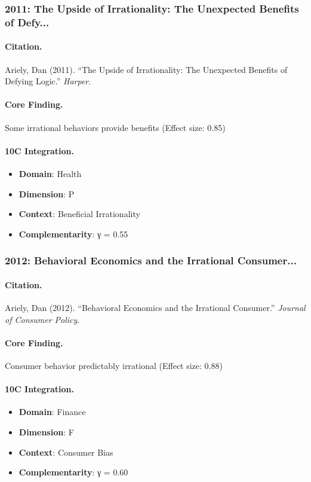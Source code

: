 \subsubsection{2011: The Upside of Irrationality: The Unexpected Benefits of Defy...}

\paragraph{Citation.}
Ariely, Dan (2011). ``The Upside of Irrationality: The Unexpected Benefits of Defying Logic.''
\textit{Harper}.

\paragraph{Core Finding.}
Some irrational behaviors provide benefits (Effect size: 0.85)

\paragraph{10C Integration.}
\begin{itemize}[nosep]
  \item \textbf{Domain}: Health
  \item \textbf{Dimension}: P
  \item \textbf{Context}: Beneficial Irrationality
  \item \textbf{Complementarity}: γ = 0.55
\end{itemize}

\subsubsection{2012: Behavioral Economics and the Irrational Consumer...}

\paragraph{Citation.}
Ariely, Dan (2012). ``Behavioral Economics and the Irrational Consumer.''
\textit{Journal of Consumer Policy}.

\paragraph{Core Finding.}
Consumer behavior predictably irrational (Effect size: 0.88)

\paragraph{10C Integration.}
\begin{itemize}[nosep]
  \item \textbf{Domain}: Finance
  \item \textbf{Dimension}: F
  \item \textbf{Context}: Consumer Bias
  \item \textbf{Complementarity}: γ = 0.60
\end{itemize}

